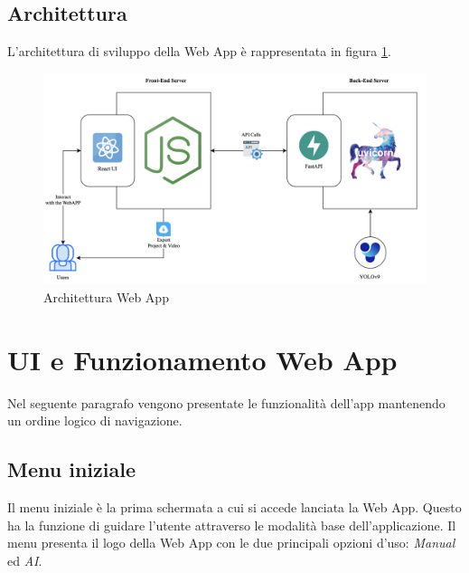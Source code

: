 \subsection{Architettura}
\label{sec:architettura}

L'architettura di sviluppo della Web App è rappresentata in figura \ref{fig:architettura_app}.

\begin{figure}[h]
    \centering
    \includegraphics[width=1.02\textwidth]{img/Architettura.png}
    \caption{Architettura Web App}
    \label{fig:architettura_app}
\end{figure}







\section{UI e Funzionamento Web App}
\label{sec:funzionamento}

Nel seguente paragrafo vengono presentate le funzionalità dell'app mantenendo un ordine logico di navigazione.


\subsection{Menu iniziale}
\label{sec:menu_iniziale}

Il menu iniziale è la prima schermata a cui si accede lanciata la Web App. Questo ha la funzione di guidare l'utente attraverso le modalità base dell'applicazione. Il menu presenta il logo della Web App con le due principali opzioni d'uso: \textit{Manual} ed \textit{AI}.



